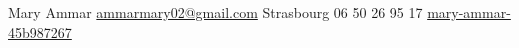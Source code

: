 \documentclass[lighthipster]{simplehipstercv}
\newlength{\rightcolwidth}
\begin{document}
\begin{paracol}{2}
\vfill{} %

\setlength{\parindent}{0pt}
\begin{minipage}[t]{\rightcolwidth}
\begin{center}\fontfamily{\sfdefault}\selectfont \color{black!70}
{\small Mary Ammar  \href{mailto:ammarmary02@gmail.com}{ammarmary02@gmail.com}
 Strasbourg
 06 50 26 95 17
 \href{https://www.linkedin.com/in/mary-ammar-45b987267}{mary-ammar-45b987267}}
\end{center}
\end{minipage}

\end{paracol}
\end{document}
